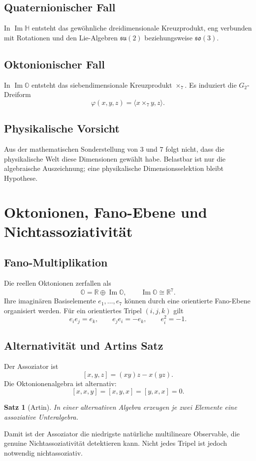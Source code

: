 \documentclass[11pt,a4paper]{article}
\newtheorem{theorem}{Satz}
\newcommand{\OO}{\mathbb O}
\newcommand{\HH}{\mathbb H}
\newcommand{\RR}{\mathbb R}
\begin{document}
\subsection{Quaternionischer Fall}
In $\operatorname{Im}\HH$ entsteht das gewöhnliche dreidimensionale Kreuzprodukt, eng verbunden mit Rotationen und den Lie-Algebren $\mathfrak{su}(2)$ beziehungsweise $\mathfrak{so}(3)$.

\subsection{Oktonionischer Fall}
In $\operatorname{Im}\OO$ entsteht das siebendimensionale Kreuzprodukt $\times_7$. Es induziert die $G_2$-Dreiform
\[
\varphi(x,y,z)=\langle x\times_7y,z\rangle.
\]

\subsection{Physikalische Vorsicht}
Aus der mathematischen Sonderstellung von $3$ und $7$ folgt nicht, dass die physikalische Welt diese Dimensionen gewählt habe. Belastbar ist nur die algebraische Auszeichnung; eine physikalische Dimensionsselektion bleibt Hypothese.

\section{Oktonionen, Fano-Ebene und Nichtassoziativität}
\subsection{Fano-Multiplikation}
Die reellen Oktonionen zerfallen als
\[
\OO=\RR\oplus\operatorname{Im}\OO,\qquad \operatorname{Im}\OO\cong\RR^7.
\]
Ihre imaginären Basiselemente $e_1,\dots,e_7$ können durch eine orientierte Fano-Ebene organisiert werden. Für ein orientiertes Tripel $(i,j,k)$ gilt
\[
e_ie_j=e_k,\qquad e_je_i=-e_k,\qquad e_i^2=-1.
\]

\subsection{Alternativität und Artins Satz}
Der Assoziator ist
\[
[x,y,z]=(xy)z-x(yz).
\]
Die Oktonionenalgebra ist alternativ:
\[
[x,x,y]=[x,y,x]=[y,x,x]=0.
\]
\begin{theorem}[Artin]
In einer alternativen Algebra erzeugen je zwei Elemente eine assoziative Unteralgebra.
\end{theorem}
Damit ist der Assoziator die niedrigste natürliche multilineare Observable, die genuine Nichtassoziativität detektieren kann. Nicht jedes Tripel ist jedoch notwendig nichtassoziativ.
\end{document}
